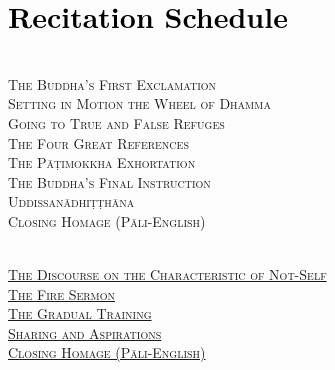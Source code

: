 \section{\textcolor{black}{Recitation Schedule}}
\label{schedule}

\begin{center}

  {\libertinusFont\selectfont\textbf{\textsc{}}}\\

  \textsc{
    The Buddha's First Exclamation \pageref{buddhas-first-exclamation}\\
    Setting in Motion the Wheel of Dhamma \pageref{wheel-of-dhamma-abridged}\\
    Going to True and False Refuges \pageref{true-false-refuges}\\
    The Four Great References \pageref{four-great-references}\\
    The Pāṭimokkha Exhortation \pageref{patimokkha-exhortation}\\
    The Buddha's Final Instruction \pageref{buddhas-final-instruction}\\
    Uddissanādhiṭṭhāna \pageref{uddissanadhitthana}\\
    Closing Homage (Pāli-English)} \pageref{closing-homage}\\

  \bigskip

  {\libertinusFont\selectfont\textbf{\textsc{}}}\\

  \textsc{
    \hyperref[characteristic-of-not-self]{The Discourse on the Characteristic of Not-Self} \pageref{characteristic-of-not-self}\\
    \hyperref[fire-sermon]{The Fire Sermon} \pageref{fire-sermon}\\
    \hyperref[gradual-training]{The Gradual Training} \pageref{gradual-training}\\
    \hyperref[sharing-aspirations]{Sharing and Aspirations} \pageref{sharing-aspirations}\\
    \hyperref[closing-homage]{Closing Homage (Pāli-English)}} \pageref{closing-homage}\\

  \bigskip

  {\libertinusFont\selectfont\textbf{\textsc{}}}\\


\end{center}
